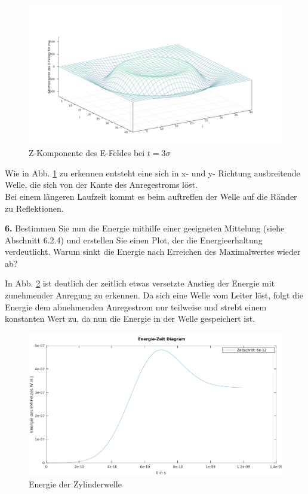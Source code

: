 \documentclass[Protokollheft.tex]{subfiles}
\begin{document}
\begin{figure}[h]
	\centering
	\includegraphics[width=0.7\linewidth]{Welle}
	\caption{Z-Komponente des E-Feldes bei $t= 3\sigma$}
	\label{fig:welle}
\end{figure}
\noindent
Wie in Abb. \ref{fig:welle} zu erkennen entsteht eine sich in x- und y- Richtung ausbreitende Welle, die sich von der Kante des Anregestroms löst.\\
Bei einem längeren Laufzeit kommt es beim auftreffen der Welle auf die Ränder zu Reflektionen.

\begin{framed}
	\noindent \textbf{6.} Bestimmen Sie nun die Energie mithilfe einer geeigneten Mittelung (siehe Abschnitt 6.2.4) und erstellen Sie einen Plot, der die Energieerhaltung verdeutlicht. Warum sinkt die Energie nach Erreichen des Maximalwertes wieder ab?\label{exer:energyConservation}
\end{framed}
\noindent
In Abb. \ref{fig:enegiedesfeldes} ist deutlich der zeitlich etwas versetzte Anstieg der Energie mit zunehmender Anregung zu erkennen. Da sich eine Welle vom Leiter löst, folgt die Energie dem abnehmenden Anregestrom nur teilweise und strebt einem konstanten Wert zu, da nun die Energie in der Welle gespeichert ist.
\begin{figure}[h]
	\centering
	\includegraphics[width=0.7\linewidth]{EnegiedesFeldes}
	\caption{Energie der Zylinderwelle}
	\label{fig:enegiedesfeldes}
\end{figure}
\end{document}
